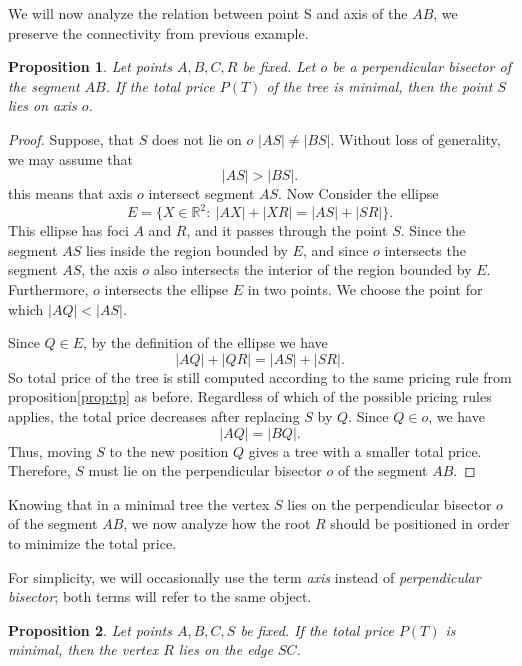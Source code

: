 \documentclass[openany]{book}
\newcommand{\Ptotal}[1]{P(#1)}
\newtheorem{proposition}{Proposition}
\begin{document}
	
	
	We will now analyze the relation between point S and axis of the \(AB\), we preserve the connectivity from previous example.
	\begin{proposition}\label{prop:Sino}
		Let points \(A,B,C,R\) be fixed. Let \(o\) be a perpendicular bisector of the segment \(AB\). 
		If the total price \(P(T)\) of the tree is minimal, then the point \(S\) lies on axis \(o\).
	\end{proposition}	
	\begin{proof}
		Suppose, that \(S\) does not lie on \(o\) \(|AS|\neq |BS|\). Without loss of generality, we may assume that
		\[
		|AS|>|BS|.
		\]
		this means that axis \(o\) intersect segment \(AS\). 
		Now Consider the ellipse
		\[
		E=\{X\in\mathbb{R}^2:\ |AX|+|XR|=|AS|+|SR|\}.
		\]
		This ellipse has foci \(A\) and \(R\), and it passes through the point \(S\).
		Since the segment \(AS\) lies inside the region bounded by \(E\), and since
		\(o\) intersects the segment \(AS\), the axis \(o\) also intersects the
		interior of the region bounded by \(E\). Furthermore, \(o\) intersects the
		ellipse \(E\) in two points.
		We choose the point for which \(|AQ|<|AS|.\)
		
		Since \(Q\in E\), by the definition of the ellipse we have
		\[
		|AQ|+|QR|=|AS|+|SR|.
		\]
		So total price of the tree is still computed according to the same pricing rule from proposition\ref{prop:tp} as before. Regardless of which of the possible pricing rules applies, the total price decreases after replacing \(S\) by \(Q\).
		Since \(Q\in o\), we have
		\[
		|AQ|=|BQ|.
		\]
		Thus, moving \(S\) to the new position \(Q\) gives a tree with a smaller total price. Therefore, \(S\) must lie on the perpendicular bisector \(o\) of the segment \(AB\).
	\end{proof}	 
	
	Knowing that in a minimal tree the vertex \(S\) lies on the perpendicular
	bisector \(o\) of the segment \(AB\), we now analyze how the root \(R\) should
	be positioned in order to minimize the total price.
	
	For simplicity, we will occasionally use the term \emph{axis} instead of
	\emph{perpendicular bisector}; both terms will refer to the same object.
	
	\begin{proposition}\label{prop:R_on_SC}
		Let points \(A,B,C,S\) be fixed. If the total price \(\Ptotal{T}\) is minimal, then the vertex \(R\)
		lies on the edge \(SC\).
	\end{proposition}
	
\end{document}
